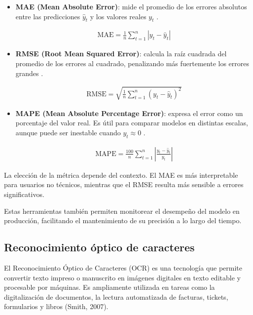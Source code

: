 \begin{itemize}
    \item \textbf{MAE (Mean Absolute Error)}: mide el promedio de los errores absolutos entre las predicciones $\hat{y}_t$ y los valores reales $y_t$ \parencite{willmott2005}.
    
    \begin{align}
        \text{MAE} = \frac{1}{n} \sum_{t=1}^{n} \left| y_t - \hat{y}_t \right|
    \end{align}

    \item \textbf{RMSE (Root Mean Squared Error)}: calcula la raíz cuadrada del promedio de los errores al cuadrado, penalizando más fuertemente los errores grandes \parencite{chai2014}.
    
    \begin{align}
        \text{RMSE} = \sqrt{ \frac{1}{n} \sum_{t=1}^{n} \left( y_t - \hat{y}_t \right)^2 }
    \end{align}

    \item \textbf{MAPE (Mean Absolute Percentage Error)}: expresa el error como un porcentaje del valor real. Es útil para comparar modelos en distintas escalas, aunque puede ser inestable cuando $y_t \approx 0$ \parencite{myttenaere2016}.
    
    \begin{align}
        \text{MAPE} = \frac{100}{n} \sum_{t=1}^{n} \left| \frac{y_t - \hat{y}_t}{y_t} \right|
    \end{align}
\end{itemize}

La elección de la métrica depende del contexto. El MAE es más interpretable para usuarios no técnicos, mientras que el RMSE resulta más sensible a errores significativos. 

Estas herramientas también permiten monitorear el desempeño del modelo en producción, facilitando el mantenimiento de su precisión a lo largo del tiempo.

\subsection{Reconocimiento óptico de caracteres}

\indent El Reconocimiento Óptico de Caracteres (OCR) es una tecnología que permite convertir texto impreso o manuscrito en imágenes digitales en texto editable y procesable por máquinas. Es ampliamente utilizada en tareas como la digitalización de documentos, la lectura automatizada de facturas, tickets, formularios y libros (Smith, 2007).


